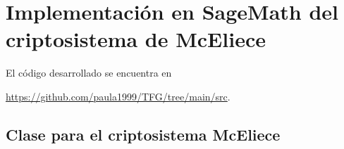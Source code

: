 \chapter[Implementación en SageMath del criptosistema de McEliece]{Implementación en SageMath del criptosistema de McEliece}
\label{annex:sage-McEliece}


El código desarrollado se encuentra en
\begin{center}
\url{https://github.com/paula1999/TFG/tree/main/src}.
\end{center}

\section{Clase para el criptosistema McEliece}


